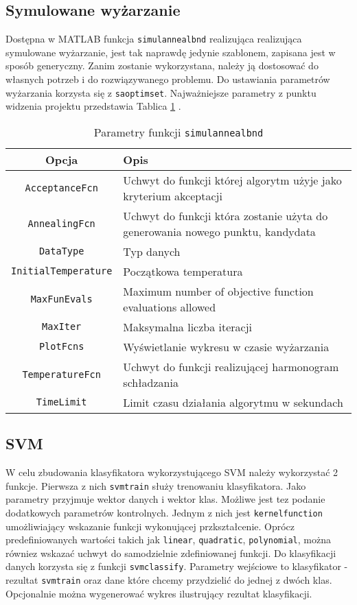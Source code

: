\documentclass{article}
\begin{document}
\subsection{Symulowane wyżarzanie}
Dostępna w MATLAB funkcja \texttt{simulannealbnd} realizująca realizująca symulowane wyżarzanie, jest tak naprawdę jedynie szablonem, zapisana jest w sposób generyczny. Zanim zostanie wykorzystana, należy ją dostosować do własnych potrzeb i do rozwiązywanego problemu.
Do ustawiania parametrów wyżarzania korzysta się z \texttt{saoptimset}. Najważniejsze parametry z punktu widzenia projektu przedstawia Tablica \ref{tab:saoptimset} .

\begin{table}[h]
\caption{Parametry funkcji \texttt{simulannealbnd}}
\label{tab:saoptimset}
\begin{tabular}{|c|p{7cm}|}
\hline
Opcja & Opis \\ \hline \hline
\texttt{AcceptanceFcn} & Uchwyt do funkcji której algorytm użyje jako kryterium akceptacji \\ \hline
\texttt{AnnealingFcn} & Uchwyt do funkcji która zostanie użyta do generowania nowego punktu, kandydata \\ \hline
\texttt{DataType} & Typ danych \\ \hline
\texttt{InitialTemperature} & Początkowa temperatura \\ \hline
\texttt{MaxFunEvals} & Maximum number of objective function evaluations allowed \\ \hline
\texttt{MaxIter} & Maksymalna liczba iteracji \\ \hline
\texttt{PlotFcns} & Wyświetlanie wykresu w czasie wyżarzania \\ \hline
\texttt{TemperatureFcn} & Uchwyt do funkcji realizującej harmonogram schładzania \\ \hline
\texttt{TimeLimit} & Limit czasu działania algorytmu w sekundach \\ \hline
\end{tabular}
\end{table}

\subsection{SVM}
W celu zbudowania klasyfikatora wykorzystującego SVM należy wykorzystać 2 funkcje. Pierwsza z nich \texttt{svmtrain}  służy trenowaniu klasyfikatora. Jako parametry przyjmuje wektor danych i wektor klas. Możliwe jest tez podanie dodatkowych parametrów kontrolnych. Jednym z nich jest \texttt{kernelfunction} umożliwiający wskazanie funkcji wykonującej przkształcenie. Oprócz predefiniowanych wartości takich jak \texttt{linear}, \texttt{quadratic}, \texttt{polynomial}, można równiez wskazać uchwyt do samodzielnie zdefiniowanej funkcji.
Do klasyfikacji danych korzysta się z funkcji \texttt{svmclassify}. Parametry wejściowe to klasyfikator - rezultat \texttt{svmtrain} oraz dane które chcemy przydzielić do jednej z dwóch klas. Opcjonalnie można wygenerować wykres ilustrujący rezultat klasyfikacji.
\end{document}
